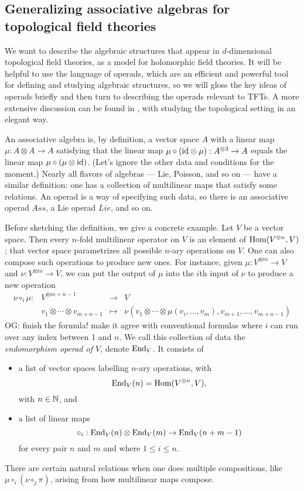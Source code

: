 \documentclass[11pt]{amsart}
\def\owen#1{{\textcolor{violet!65!black}{OG: {#1}}}}
\begin{document}
\subsection{Generalizing associative algebras for topological field theories}

We want to describe the algebraic structures that appear in $d$-dimensional topological field theories,
as a model for holomorphic field theories.
It will be helpful to use the language of operads, which are an efficient and powerful tool for defining and studying algebraic structures,
so we will gloss the key ideas of operads briefly and then turn to describing the operads relevant to TFTs.
A more extensive discussion can be found in \cite{CG1}, with \cite{ES} studying the topological setting in an elegant way.

An associative algebra is, by definition, a vector space $A$ with a linear map $\mu: A\otimes A \to A$ satisfying that the linear map $\mu \circ ({\rm id} \otimes \mu): A^{\otimes 3} \to A$ equals the linear map $\mu \circ (\mu \otimes {\rm id})$.
(Let's ignore the other data and conditions for the moment.)
Nearly all flavors of algebras --- Lie, Poisson, and so on --- have a similar definition:
one has a collection of multilinear maps that satisfy some relations.
An operad is a way of specifying such data, so there is an associative operad $Ass$,
a Lie operad $Lie$, and so on.

Before sketching the definition, we give a concrete example.
Let $V$ be a vector space.
Then every $n$-fold multilinear operator on $V$ is an element of ${\rm Hom}(V^{\otimes n}, V)$;
that vector space parametrizes all possible $n$-ary operations on $V$.
One can also compose such operations to produce new ones.
For instance, given $\mu : V^{\otimes m} \to V$ and $\nu: V^{\otimes m} \to V$, we can put the output of $\mu$ into the $i$th input of $\nu$ to produce a new operation
\[
\begin{array}{cccc}
\nu \circ_i \mu: & V^{\otimes m+n-1} & \to & V\\
& v_1 \otimes \cdots \otimes v_{m+n-1} & \mapsto & \nu(v_1 \otimes \cdots \otimes \mu(v_i, \ldots, v_m), v_{m+1}, \ldots, v_{m+n-1})
\end{array}
\]
\owen{finish the formula! make it agree with conventional formulas}
where $i$ can run over any index between 1 and $n$.
We call this collection of data the {\em endomorphism operad of $V$}, denote ${\rm End}_V$.
It consists of 
\begin{itemize}
\item a list of vector spaces labelling $n$-ary operations, with 
\[
{\rm End}_V(n)= {\rm Hom}(V^{\otimes n}, V),
\]
with $n \in \mathbb N$, and
\item a list of linear maps
\[
\circ_i : {\rm End}_V(n) \otimes {\rm End}_V(m) \to {\rm End}_V(n+m-1)
\]
for every pair $n$ and $m$ and where $1 \leq i \leq n$.
\end{itemize}
There are certain natural relations when one does multiple compositions, like $\mu \circ_i (\nu \circ_j \pi)$, arising from how multilinear maps compose.
\end{document}
